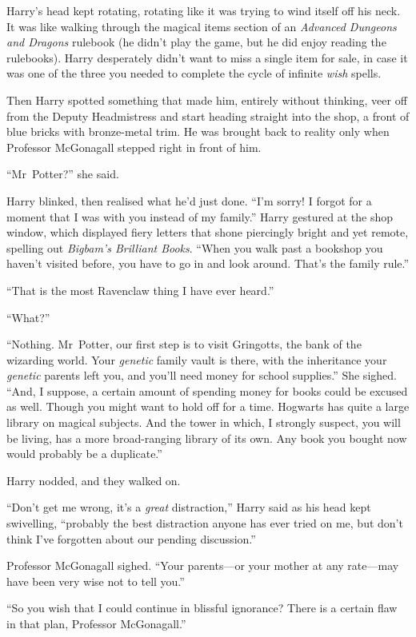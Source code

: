 Harry’s head kept rotating, rotating like it was trying to wind itself off his neck. It was like walking through the magical items section of an \emph{Advanced Dungeons and Dragons} rulebook (he didn’t play the game, but he did enjoy reading the rulebooks). Harry desperately didn’t want to miss a single item for sale, in case it was one of the three you needed to complete the cycle of infinite \emph{wish} spells.

Then Harry spotted something that made him, entirely without thinking, veer off from the Deputy Headmistress and start heading straight into the shop, a front of blue bricks with bronze-metal trim. He was brought back to reality only when Professor McGonagall stepped right in front of him.

“Mr~Potter?” she said.

Harry blinked, then realised what he’d just done. “I’m sorry! I forgot for a moment that I was with you instead of my family.” Harry gestured at the shop window, which displayed fiery letters that shone piercingly bright and yet remote, spelling out \emph{Bigbam’s Brilliant Books}. “When you walk past a bookshop you haven’t visited before, you have to go in and look around. That’s the family rule.”

“That is the most Ravenclaw thing I have ever heard.”

“What?”

“Nothing. Mr~Potter, our first step is to visit Gringotts, the bank of the wizarding world. Your \emph{genetic} family vault is there, with the inheritance your \emph{genetic} parents left you, and you’ll need money for school supplies.” She sighed. “And, I suppose, a certain amount of spending money for books could be excused as well. Though you might want to hold off for a time. Hogwarts has quite a large library on magical subjects. And the tower in which, I strongly suspect, you will be living, has a more broad-ranging library of its own. Any book you bought now would probably be a duplicate.”

Harry nodded, and they walked on.

“Don’t get me wrong, it’s a \emph{great} distraction,” Harry said as his head kept swivelling, “probably the best distraction anyone has ever tried on me, but don’t think I’ve forgotten about our pending discussion.”

Professor McGonagall sighed. “Your parents—or your mother at any rate—may have been very wise not to tell you.”

“So you wish that I could continue in blissful ignorance? There is a certain flaw in that plan, Professor McGonagall.”

